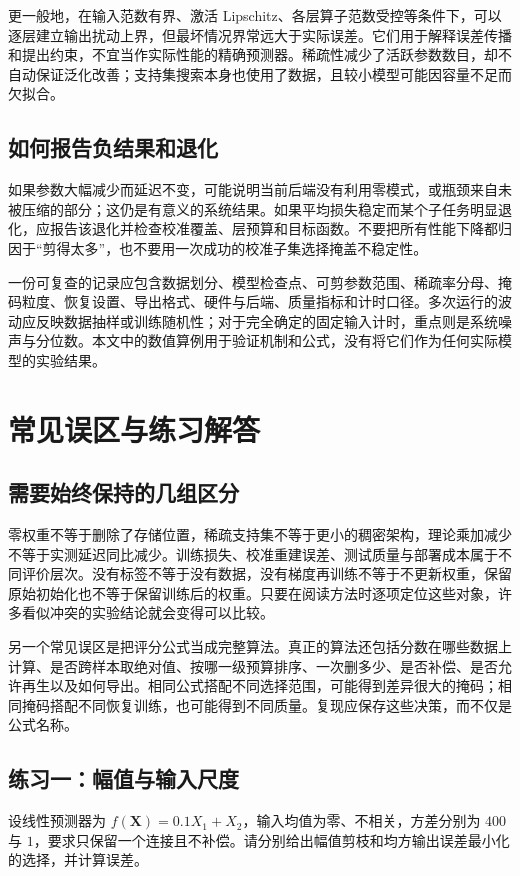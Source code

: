 \documentclass[UTF8,12pt,a4paper,fontset=fandol]{ctexart}
\begin{document}
更一般地，在输入范数有界、激活 Lipschitz、各层算子范数受控等条件下，可以逐层建立输出扰动上界，但最坏情况界常远大于实际误差。它们用于解释误差传播和提出约束，不宜当作实际性能的精确预测器。稀疏性减少了活跃参数数目，却不自动保证泛化改善；支持集搜索本身也使用了数据，且较小模型可能因容量不足而欠拟合。

\subsection{如何报告负结果和退化}
如果参数大幅减少而延迟不变，可能说明当前后端没有利用零模式，或瓶颈来自未被压缩的部分；这仍是有意义的系统结果。如果平均损失稳定而某个子任务明显退化，应报告该退化并检查校准覆盖、层预算和目标函数。不要把所有性能下降都归因于“剪得太多”，也不要用一次成功的校准子集选择掩盖不稳定性。

一份可复查的记录应包含数据划分、模型检查点、可剪参数范围、稀疏率分母、掩码粒度、恢复设置、导出格式、硬件与后端、质量指标和计时口径。多次运行的波动应反映数据抽样或训练随机性；对于完全确定的固定输入计时，重点则是系统噪声与分位数。本文中的数值算例用于验证机制和公式，没有将它们作为任何实际模型的实验结果。

\section{常见误区与练习解答}
\label{sec:prune-exercises}

\subsection{需要始终保持的几组区分}
零权重不等于删除了存储位置，稀疏支持集不等于更小的稠密架构，理论乘加减少不等于实测延迟同比减少。训练损失、校准重建误差、测试质量与部署成本属于不同评价层次。没有标签不等于没有数据，没有梯度再训练不等于不更新权重，保留原始初始化也不等于保留训练后的权重。只要在阅读方法时逐项定位这些对象，许多看似冲突的实验结论就会变得可以比较。

另一个常见误区是把评分公式当成完整算法。真正的算法还包括分数在哪些数据上计算、是否跨样本取绝对值、按哪一级预算排序、一次删多少、是否补偿、是否允许再生以及如何导出。相同公式搭配不同选择范围，可能得到差异很大的掩码；相同掩码搭配不同恢复训练，也可能得到不同质量。复现应保存这些决策，而不仅是公式名称。

\subsection{练习一：幅值与输入尺度}
设线性预测器为 $f(\mathbf X)=0.1X_1+X_2$，输入均值为零、不相关，方差分别为 $400$ 与 $1$，要求只保留一个连接且不补偿。请分别给出幅值剪枝和均方输出误差最小化的选择，并计算误差。
\end{document}
